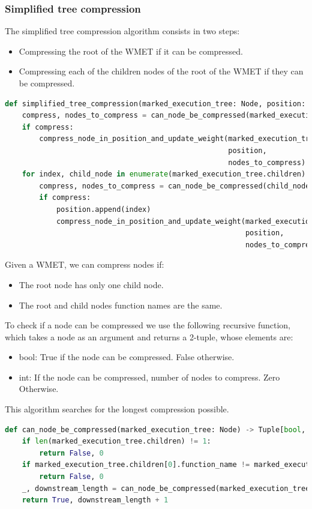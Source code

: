 \subsubsection{Simplified tree compression}
The simplified tree compression algorithm consists in two steps:
\begin{itemize}
    \item Compressing the root of the WMET if it can be compressed.
    \item Compressing each of the children nodes of the root of the WMET if they can be compressed.
\end{itemize}
\begin{lstlisting}[language=Python, caption=Simplified tree compression algorithm]
def simplified_tree_compression(marked_execution_tree: Node, position: List[int]) -> None:
    compress, nodes_to_compress = can_node_be_compressed(marked_execution_tree)
    if compress:
        compress_node_in_position_and_update_weight(marked_execution_tree,
                                                    position,
                                                    nodes_to_compress)
    for index, child_node in enumerate(marked_execution_tree.children):
        compress, nodes_to_compress = can_node_be_compressed(child_node)
        if compress:
            position.append(index)
            compress_node_in_position_and_update_weight(marked_execution_tree,
                                                        position,
                                                        nodes_to_compress)
\end{lstlisting}
Given a WMET, we can compress nodes if:
\begin{itemize}
    \item The root node has only one child node.
    \item The root and child nodes function names are the same.
\end{itemize}
To check if a node can be compressed we use the following recursive function, which takes a node as an argument and returns a 2-tuple, whose elements are:
\begin{itemize}
    \item bool: True if the node can be compressed. False otherwise.
    \item int: If the node can be compressed, number of nodes to compress. Zero Otherwise. 
\end{itemize}
This algorithm searches for the longest compression possible.
\begin{lstlisting}[language=Python, caption=Checking if node can be compressed]
def can_node_be_compressed(marked_execution_tree: Node) -> Tuple[bool, int]:
    if len(marked_execution_tree.children) != 1:
        return False, 0
    if marked_execution_tree.children[0].function_name != marked_execution_tree.function_name:
        return False, 0
    _, downstream_length = can_node_be_compressed(marked_execution_tree.children[0])
    return True, downstream_length + 1
\end{lstlisting}

